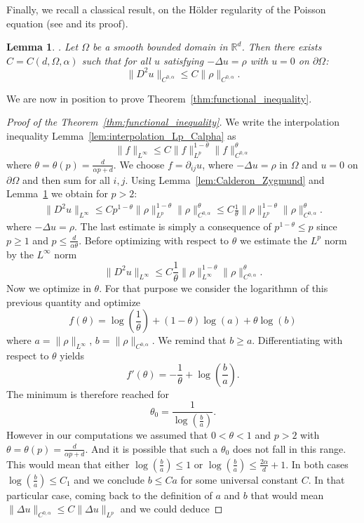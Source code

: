 \documentclass[a4paper,twosided, 11pt]{article}
\renewcommand{\color}[2][]{}
\newcommand{\R}{\mathbb{R}}
\newcommand {\f}   {\frac}
\newcommand {\p}   {\partial}
\theoremstyle{plain}
\newtheorem{lemma}[thm]{Lemma}
\theoremstyle{remark}
\numberwithin{equation}{section}
\begin{document}
{\color{blue}Finally, we recall a classical result, on the Hölder regularity of the Poisson equation (see \cite[Theorem 6.8]{gilbarg2001elliptic} and its proof).
\begin{lemma}\label{lem:Hölder regularity}.
Let $\Omega$ be a smooth bounded domain in $\R^d$. Then there exists $C=C(d,\Omega,\alpha)$ such that for all $u$ satisfying $-\Delta u = \rho$ with $u=0$ on $\p\Omega$:
$$
\|D^{2} u\|_{C^{0,\alpha}} \le C\|\rho\|_{C^{0,\alpha}}.   
$$
\end{lemma}
}
We are now in position to prove Theorem~\ref{thm:functional_inequality}.
\begin{proof}[Proof of the Theorem~\ref{thm:functional_inequality}]
We write the interpolation inequality Lemma~\ref{lem:interpolation_Lp_Calpha} as 
$$
\|f\|_{L^{\infty}}\le C \|f\|_{L^{p}}^{1-\theta}\|f\|_{C^{0,\alpha}}^{\theta}
$$
where $\theta = \theta(p) = \f{d}{\alpha p+d}$.
We choose $f=\p_{ij} u$, where $-\Delta u =\rho$ in $\Omega$ and $u=0$ on $\p\Omega$ and then sum for all $i,j$. Using Lemma~\ref{lem:Calderon_Zygmund} and Lemma~\ref{lem:Hölder regularity} we obtain for $p> 2$:
\begin{align*}
\|D^{2}u\|_{L^{\infty}}\le C p^{1-\theta}\|\rho\|_{L^{p}}^{1-\theta}\|\rho\|_{C^{0,\alpha}}^{\theta}
\le C \f{1}{\theta} \|\rho\|_{L^{p}}^{1-\theta}\|\rho\|_{C^{0,\alpha}}^{\theta}.
\end{align*}
where $-\Delta u =\rho$. The last estimate is simply a consequence of $p^{1-\theta}\le p$ since $p\ge 1$ and $p\le \f{d}{\alpha\theta}$. Before optimizing with respect to $\theta$ we estimate the $L^p$ norm by the $L^{\infty}$ norm 
$$
\|D^{2}u\|_{L^{\infty}}\le C \f{1}{\theta} \|\rho\|_{L^{\infty}}^{1-\theta}\|\rho\|_{C^{0,\alpha}}^{\theta}.
$$
Now we optimize in $\theta$. For that purpose we consider the logarithmn of this previous quantity and optimize
$$
f(\theta) = \log\left(\f 1\theta\right) + (1-\theta) \log(a) + \theta \log(b)
$$
where $a=\|\rho\|_{L^{\infty}}$, $b=\|\rho\|_{C^{0,\alpha}}$. We remind that $b\ge a$.
Differentiating with respect to $\theta$ yields
$$
f'(\theta)=-\f{1}{\theta}+\log\left(\f{b}{a}\right).
$$
The minimum is therefore reached for 
$$
\theta_{0} = \f{1}{\log\left(\f{b}{a}\right)}.
$$
However in our computations we assumed that $0<\theta<1$ and $p>2$ with $\theta = \theta(p) = \f{d}{\alpha p + d}$. And it is possible that such a $\theta_{0}$ does not fall in this range. This would mean that either $\log\left(\f{b}{a}\right)\le 1$ or $\log\left(\f{b}{a}\right)\le \f{2\alpha}{d}+1$. In both cases $\log\left(\f{b}{a}\right)\le C_1$ and we conclude $b\le C a$ for some universal constant $C$. In that particular case, coming back to the definition of $a$ and $b$ that would mean $\|\Delta u\|_{C^{0,\alpha}}\le C\|\Delta u\|_{L^{p}}$ and we could deduce

\end{proof}
\end{document}
